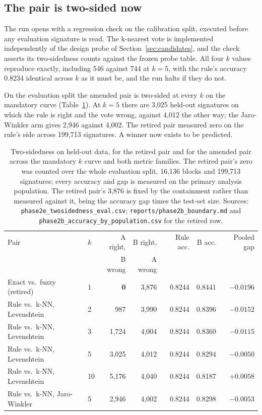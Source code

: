 \documentclass[11pt]{article}
\begin{document}
\subsection{The pair is two-sided now}
\label{sec:two-sided}

The run opens with a regression check on the calibration split, executed
before any evaluation signature is read. The k-nearest vote is implemented
independently of the design probe of Section~\ref{sec:candidates}, and the
check asserts its two-sidedness counts against the frozen probe table. All
four $k$ values reproduce exactly, including 546 against 744 at $k = 5$, with
the rule's accuracy 0.8234 identical across $k$ as it must be, and the run
halts if they do not.

On the evaluation split the amended pair is two-sided at every $k$ on the
mandatory curve (Table~\ref{tab:twosided}). At $k = 5$ there are 3{,}025
held-out signatures on which the rule is right and the vote wrong, against
4{,}012 the other way; the Jaro-Winkler arm gives 2{,}946 against 4{,}002.
The retired pair measured zero on the rule's side across 199{,}713
signatures. A winner now exists to be predicted.

\begin{table}[htbp]
\centering
\caption{Two-sidedness on held-out data, for the retired pair and for the
amended pair across the mandatory $k$ curve and both metric families. The
retired pair's zero was counted over the whole evaluation split, 16{,}136
blocks and 199{,}713 signatures; every accuracy and gap is measured on the
primary analysis population. The retired pair's 3{,}876 is fixed by the
containment rather than measured against it, being the accuracy gap times the
test-set size. Sources: \texttt{phase2e\_twosidedness\_eval.csv};
\texttt{reports/phase2b\_boundary.md} and
\texttt{phase2b\_accuracy\_by\_population.csv} for the retired row.}
\label{tab:twosided}
\small
\begin{tabular}{llrrrrr}
\toprule
Pair & $k$ & A right, & B right, & Rule acc. & B acc. & Pooled gap \\
     &     & B wrong  & A wrong  &           &        & \\
\midrule
Exact vs.\ fuzzy (retired) & 1 & \textbf{0} & 3{,}876 & 0.8244 & 0.8441 & $-0.0196$ \\
\midrule
Rule vs.\ k-NN, Levenshtein & 2 & 987 & 3{,}990 & 0.8244 & 0.8396 & $-0.0152$ \\
Rule vs.\ k-NN, Levenshtein & 3 & 1{,}724 & 4{,}004 & 0.8244 & 0.8360 & $-0.0115$ \\
Rule vs.\ k-NN, Levenshtein & 5 & 3{,}025 & 4{,}012 & 0.8244 & 0.8294 & $-0.0050$ \\
Rule vs.\ k-NN, Levenshtein & 10 & 5{,}176 & 4{,}040 & 0.8244 & 0.8187 & $+0.0058$ \\
Rule vs.\ k-NN, Jaro-Winkler & 5 & 2{,}946 & 4{,}002 & 0.8244 & 0.8298 & $-0.0053$ \\
\bottomrule
\end{tabular}
\end{table}
\end{document}
